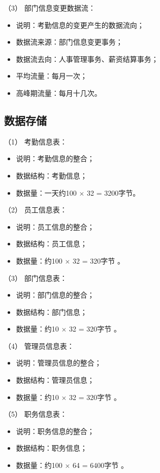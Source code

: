 \documentclass[withoutpreface,bwprint]{cumcmthesis} %
\newcommand{\kuohao}[1]{ \noindent （#1）}
\begin{document}
\kuohao{3} 部门信息变更数据流：
\begin{itemize}
\item 说明：考勤信息的变更产生的数据流向；
\item 数据流来源：部门信息变更事务；
\item 数据流去向：人事管理事务、薪资结算事务；
\item 平均流量：每月一次；
\item 高峰期流量：每月十几次。
\end{itemize}

\subsection{数据存储}
\kuohao{1} 考勤信息表：
\begin{itemize}
\item 说明：考勤信息的整合；
\item 数据结构：考勤信息；
\item 数据量：一天约100 $\times$ 32 = 3200字节。
\end{itemize}

\kuohao{2} 员工信息表：
\begin{itemize}
\item 说明：员工信息的整合；
\item 数据结构：员工信息；
\item 数据量：约100 $\times$ 32 = 320字节 。
\end{itemize}

\kuohao{3} 部门信息表：
\begin{itemize}
\item 说明：部门信息的整合；
\item 数据结构：部门信息；
\item 数据量：约10 $\times$ 32 = 320字节 。
\end{itemize}

\kuohao{4} 管理员信息表：
\begin{itemize}
\item 说明：管理员信息的整合；
\item 数据结构：管理员信息；
\item 数据量：约10 $\times$ 32 = 320字节 。
\end{itemize}

\kuohao{5} 职务信息表：
\begin{itemize}
\item 说明：职务信息的整合；
\item 数据结构：职务信息；
\item 数据量：约100 $\times$ 64 = 6400字节 。
\end{itemize}
\end{document}
